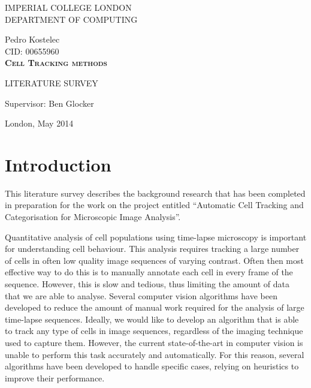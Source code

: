 \documentclass[12pt,a4paper,openany]{book}
\begin{document}
\thispagestyle{empty} 

\begin{center}
{\large 
IMPERIAL COLLEGE LONDON \\
DEPARTMENT OF COMPUTING\\
}

\vspace{3cm}
{\LARGE Pedro Kostelec}\\
CID: 00655960\\

\vspace{2cm}
\textsc{\textbf{\LARGE 
Cell Tracking methods 
}}

\vspace{2cm}
{ LITERATURE SURVEY }

\vspace{2cm} 
{\Large Supervisor: Ben Glocker}

\vfill
{\Large London, May 2014}
\end{center}



\thispagestyle{empty}

\newpage




\renewcommand\thepage{} 
\tableofcontents 
\renewcommand\thepage{\arabic{page}}

\thispagestyle{empty}

\chapter{Introduction}
This literature survey describes the background research that has been completed in preparation for the work on the project entitled ``Automatic Cell Tracking and Categorisation for Microscopic Image Analysis''.

Quantitative analysis of cell populations using time-lapse microscopy is important for understanding cell behaviour. This analysis requires tracking a large number of cells in often low quality image sequences of varying contrast. Often then most effective way to do this is to manually annotate each cell in every frame of the sequence. However, this is slow and tedious, thus limiting the amount of data that we are able to analyse. Several computer vision algorithms have been developed to reduce the amount of manual work required for the analysis of large time-lapse sequences. Ideally, we would like to develop an algorithm that is able to track any type of cells in image sequences, regardless of the imaging technique used to capture them. However, the current state-of-the-art in computer vision is unable to perform this task accurately and automatically. For this reason, several algorithms have been developed to handle specific cases, relying on heuristics to improve their performance.
\end{document}
